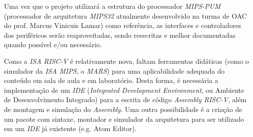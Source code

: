 \documentclass{article}
\begin{document}
    {Uma vez que o projeto utilizará a estrutura do processador \textit{MIPS-PUM} (processador de arquitetura \textit{MIPS32} atualmente desenvolvido na turma de OAC do prof. Marcus Vinicuis Lamar) como referência, as interfaces e controladores dos periféricos serão reaproveitadas, sendo reescritas e melhor documentadas quando possível e/ou necessário.}

    {Como a \textit{ISA RISC-V} é relativamente nova, faltam ferramentas didáticas (como o simulador da \textit{ISA MIPS}, o \textit{MARS}) para uma aplicabilidade adequada do conteúdo em sala de aula e em laboratório. Desta forma, é necessária a implementação de um \textit{IDE} (\textit{Integrated Development Environment}, ou Ambiente de Desenvolvimento Integrado) para a escrita de código \textit{Assembly RISC-V}, além de montagem e simulação do \textit{Assembly}. Uma outra possibilidade é a criação de um pacote com sintaxe, montador e simulador da arquitetura para ser utilizado em um \textit{IDE} já existente (e.g. Atom Editor).}
\end{document}
